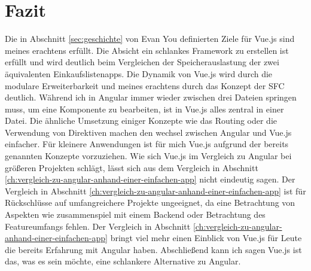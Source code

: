 

\chapter{Fazit}
Die in Abschnitt \ref{sec:geschichte} von Evan You definierten Ziele für Vue.js sind meines erachtens erfüllt.
Die Absicht ein schlankes Framework zu erstellen ist erfüllt und wird deutlich beim Vergleichen der Speicherauslastung
der zwei äquivalenten Einkaufslistenapps.
Die Dynamik von Vue.js wird durch die modulare Erweiterbarkeit und meines erachtens durch das
Konzept der SFC deutlich.
Während ich in Angular immer wieder zwischen drei Dateien springen muss, um eine Komponente zu bearbeiten,
ist in Vue.js alles zentral in einer Datei.
Die ähnliche Umsetzung einiger Konzepte wie das Routing oder die Verwendung von Direktiven machen
den wechsel zwischen Angular und Vue.js einfacher.
Für kleinere Anwendungen ist für mich Vue.js aufgrund der bereits genannten Konzepte vorzuziehen.
Wie sich Vue.js im Vergleich zu Angular bei größeren Projekten schlägt, lässt sich aus dem Vergleich
in Abschnitt \ref{ch:vergleich-zu-angular-anhand-einer-einfachen-app} nicht eindeutig sagen.
Der Vergleich in Abschnitt \ref{ch:vergleich-zu-angular-anhand-einer-einfachen-app} ist für Rückschlüsse
auf umfangreichere Projekte ungeeignet, da eine Betrachtung von Aspekten wie zusammenspiel mit einem Backend
oder Betrachtung des Featureumfangs fehlen.
Der Vergleich in Abschnitt \ref{ch:vergleich-zu-angular-anhand-einer-einfachen-app} bringt viel mehr einen
Einblick von Vue.js für Leute die bereits Erfahrung mit Angular haben.
Abschließend kann ich sagen Vue.js ist das, was es sein möchte, eine schlankere Alternative zu Angular.
